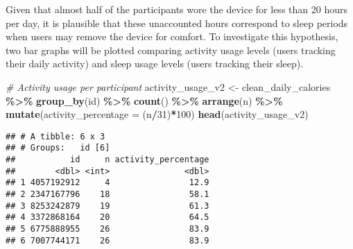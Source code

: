 \documentclass[
]{article}
\newenvironment{Shaded}{\begin{snugshade}}{\end{snugshade}}
\newcommand{\AttributeTok}[1]{\textcolor[rgb]{0.13,0.29,0.53}{#1}}
\newcommand{\CommentTok}[1]{\textcolor[rgb]{0.56,0.35,0.01}{\textit{#1}}}
\newcommand{\DecValTok}[1]{\textcolor[rgb]{0.00,0.00,0.81}{#1}}
\newcommand{\FunctionTok}[1]{\textcolor[rgb]{0.13,0.29,0.53}{\textbf{#1}}}
\newcommand{\NormalTok}[1]{#1}
\newcommand{\OtherTok}[1]{\textcolor[rgb]{0.56,0.35,0.01}{#1}}
\newcommand{\SpecialCharTok}[1]{\textcolor[rgb]{0.81,0.36,0.00}{\textbf{#1}}}
\begin{document}
Given that almost half of the participants wore the device for less than
20 hours per day, it is plausible that these unaccounted hours
correspond to sleep periods when users may remove the device for
comfort. To investigate this hypothesis, two bar graphs will be plotted
comparing activity usage levels (users tracking their daily activity)
and sleep usage levels (users tracking their sleep).

\begin{Shaded}
\begin{Highlighting}[]
\CommentTok{\# Activity usage per participant}
\NormalTok{activity\_usage\_v2 }\OtherTok{\textless{}{-}}\NormalTok{ clean\_daily\_calories }\SpecialCharTok{\%\textgreater{}\%} 
  \FunctionTok{group\_by}\NormalTok{(id) }\SpecialCharTok{\%\textgreater{}\%} 
  \FunctionTok{count}\NormalTok{() }\SpecialCharTok{\%\textgreater{}\%} 
  \FunctionTok{arrange}\NormalTok{(n) }\SpecialCharTok{\%\textgreater{}\%}
  \FunctionTok{mutate}\NormalTok{(}\AttributeTok{activity\_percentage =}\NormalTok{ (n}\SpecialCharTok{/}\DecValTok{31}\NormalTok{)}\SpecialCharTok{*}\DecValTok{100}\NormalTok{)}
\FunctionTok{head}\NormalTok{(activity\_usage\_v2)}
\end{Highlighting}
\end{Shaded}

\begin{verbatim}
## # A tibble: 6 x 3
## # Groups:   id [6]
##           id     n activity_percentage
##        <dbl> <int>               <dbl>
## 1 4057192912     4                12.9
## 2 2347167796    18                58.1
## 3 8253242879    19                61.3
## 4 3372868164    20                64.5
## 5 6775888955    26                83.9
## 6 7007744171    26                83.9
\end{verbatim}
\end{document}
